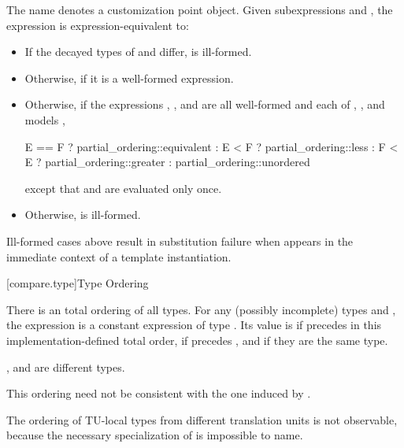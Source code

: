 %
\pnum
The name  denotes
a customization point object.
Given subexpressions  and ,
the expression 
is expression-equivalent to:
\begin{itemize}
\item
  If the decayed types of  and  differ,
   is ill-formed.
\item
  Otherwise,  if it is a well-formed expression.
\item
  Otherwise, if the expressions
  , , and 
  are all well-formed and
  each of , , and
   models
  ,
\begin{codeblock}
E == F ? partial_ordering::equivalent :
E < F  ? partial_ordering::less :
F < E  ? partial_ordering::greater :
         partial_ordering::unordered
\end{codeblock}
except that  and  are evaluated only once.
\item
  Otherwise,  is ill-formed.
\end{itemize}

\begin{note}
Ill-formed cases above result in substitution failure
when  appears in the immediate context
of a template instantiation.
\end{note}

[compare.type]{Type Ordering}

\pnum
There is an  total ordering of all types.
For any (possibly incomplete) types  and ,
the expression  is a constant expression
of type .
Its value is  if  precedes 
in this implementation-defined total order,
 if  precedes , and
 if they are the same type.
\begin{note}
,  and  are different types.
\end{note}
\begin{note}
This ordering need not be consistent with the one induced by .
\end{note}
\begin{note}
The ordering of TU-local types from different translation units is not observable,
because the necessary specialization of  is impossible to name.
\end{note}

